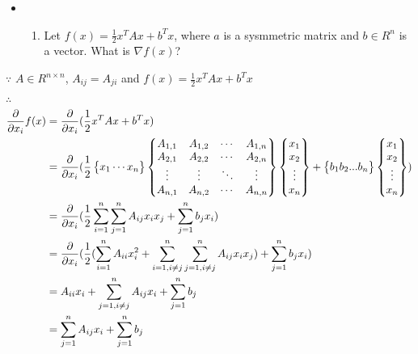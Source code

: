 \documentclass[11pt]{article}
\providecommand{\tightlist}{%
      \setlength{\itemsep}{0pt}\setlength{\parskip}{0pt}}
\begin{document}
    \begin{itemize}
\item
  \begin{enumerate}
  \def\labelenumi{\alph{enumi})}
  \tightlist
  \item
    Let \(f(x) = \frac{1}{2}x^TAx+b^Tx\), where \(a\) is a sysmmetric
    matrix and \(b\in R^n\) is a vector. What is \(\nabla f(x)\)?
  \end{enumerate}
\end{itemize}

    \(\because\) \(A\in R^{n\times n}\), \(A_{ij} = A_{ji}\) and
\(f(x)= \frac{1}{2}x^TAx+b^Tx\)

\(\therefore\) \[\begin{aligned}
    \frac{\partial}{\partial x_i} f(x) &= \frac{\partial}{\partial x_i} (\frac{1}{2}x^TAx+b^Tx) \\
    &= \frac{\partial}{\partial x_i}(\space \frac{1}{2}\left\{\begin{matrix}
            x_1 \cdots x_n
            \end{matrix}\right\}
            \left\{\begin{matrix}
            A_{1,1} & A_{1,2}\space & \cdots & A_{1,n} \\
            A_{2,1} & A_{2,2}\space & \cdots & A_{2,n} \\
            \vdots & \vdots & \ddots & \vdots \\
            A_{n,1} & A_{n,2} & \cdots & A_{n,n} \\
            \end{matrix}\right\}
            \left\{\begin{matrix}
            x_1 \\
            x_2 \\
            \vdots \\
            x_n
            \end{matrix}\right\}
            +\left\{\begin{matrix}
            b_1\space b_2\space ... b_n
            \end{matrix}\right\}\left\{\begin{matrix}
            x_1 \\
            x_2 \\
            \vdots \\
            x_n
            \end{matrix}\right\} )\\
    &= \frac{\partial}{\partial x_i} (\frac{1}{2} \sum_{i=1}^{n}\sum_{j=1}^{n}A_{ij}x_ix_j + \sum_{j=1}^n b_jx_i) \\
    &= \frac{\partial}{\partial x_i} (\frac{1}{2} (\sum_{i=1}^{n}A_{ii}x_i^2 + \sum_{i=1, i\neq j}^{n}\sum_{j=1, i\neq j}^{n}A_{ij}x_ix_j) + \sum_{j=1}^n b_jx_i) \\
    &= A_{ii}x_i + \sum_{j=1,i\neq j}^{n}A_{ij}x_i + \sum_{j=1}^{n}b_j \\
    &= \sum_{j=1}^{n}A_{ij}x_i + \sum_{j=1}^{n}b_j
\end{aligned}\]
\end{document}
